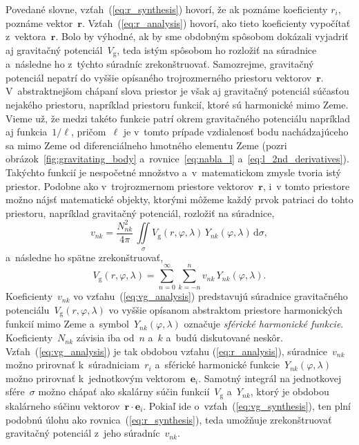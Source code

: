 \documentclass[a4paper, 12pt]{book}
\newcommand{\diff}{\mathrm d}
\newcommand{\gidx}{\mathrm g}
\let\vec\mathbf
\begin{document}
Povedané slovne, vzťah~(\ref{eq:r_synthesis}) hovorí, že ak poznáme koeficienty 
$r_i$, poznáme vektor~$\vec r$.  Vzťah~(\ref{eq:r_analysis}) hovorí, ako tieto 
koeficienty vypočítať z~vektora~$\vec r$.  Bolo by výhodné, ak by sme obdobným 
spôsobom dokázali vyjadriť aj gravitačný potenciál~$V_\gidx$, teda istým 
spôsobom ho rozložiť na súradnice a~následne ho z~týchto súradníc 
zrekonštruovať.  Samozrejme, gravitačný potenciál nepatrí do vyššie opísaného 
trojrozmerného priestoru vektorov~$\vec r$.  V~abstraktnejšom chápaní slova 
priestor je však aj gravitačný potenciál súčasťou nejakého priestoru, napríklad 
priestoru funkcií, ktoré sú harmonické mimo Zeme.  Vieme už, že medzi takéto 
funkcie patrí okrem gravitačného potenciálu napríklad aj funkcia~$1 \slash 
\ell$, pričom~$\ell$ je v~tomto prípade vzdialenosť bodu nachádzajúceho sa mimo 
Zeme od diferenciálneho hmotného elementu Zeme (pozri 
obrázok~\ref{fig:gravitating_body} a~rovnice~\ref{eq:nabla_l} 
a~\ref{eq:l_2nd_derivatives}).  Takýchto funkcií je nespočetné množstvo 
a~v~matematickom zmysle tvoria istý priestor.  Podobne ako v~trojrozmernom 
priestore vektorov~$\vec r$, i~v tomto priestore možno nájsť matematické 
objekty, ktorými môžeme každý prvok patriaci do tohto priestoru, napríklad 
gravitačný potenciál, rozložiť na súradnice,
%
\begin{equation}
\label{eq:vg_analysis}
v_{nk} = \frac{N^2_{nk}}{4\pi} \, \iint\limits_{\sigma} V_\gidx(r, \varphi, 
\lambda) \, Y_{nk}(\varphi, \lambda) \, \diff \sigma{,}
\end{equation}
%
a~následne ho spätne zrekonštruovať,
%
\begin{equation}
\label{eq:vg_synthesis}
V_\gidx(r, \varphi, \lambda) = \sum_{n = 0}^{\infty} \sum_{k = -n}^{n} v_{nk}
\, Y_{nk}(\varphi, \lambda){.}
\end{equation}
%
Koeficienty~$v_{nk}$ vo vzťahu~(\ref{eq:vg_analysis}) predstavujú súradnice
gravitačného potenciálu~$V_\gidx(r, \varphi, \lambda)$ vo vyššie opísanom
abstraktom priestore harmonických funkcií mimo Zeme a~symbol~$Y_{nk}(\varphi, 
\lambda)$
označuje \emph{sférické harmonické funkcie}.  Koeficienty~$N_{nk}$ závisia
iba od~$n$ a~$k$ a~budú diskutované neskôr.  Vzťah~(\ref{eq:vg_analysis}) je
tak obdobou vzťahu (\ref{eq:r_analysis}), súradnice~$v_{nk}$ možno prirovnať
k~súradniciam~$r_i$ a~sférické harmonické funkcie~$Y_{nk}(\varphi, \lambda)$
možno prirovnať k~jednotkovým vektorom~$\vec e_i$.  Samotný integrál na
jednotkovej sfére~$\sigma$ možno chápať ako skalárny súčin funkcií~$V_\gidx$
a~$Y_{nk}$, ktorý je obdobou skalárneho súčinu vektorov~$\vec r \cdot \vec
e_i$.  Pokiaľ ide o~vzťah~(\ref{eq:vg_synthesis}), ten plní podobnú úlohu ako
rovnica~(\ref{eq:r_synthesis}), teda umožňuje zrekonštruovať gravitačný
potenciál z~jeho súradníc~$v_{nk}$.
\end{document}

